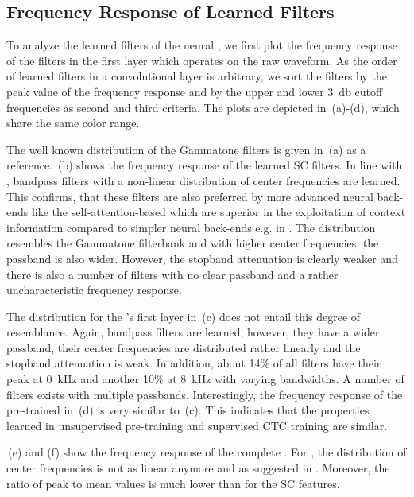 \documentclass{INTERSPEECH2023}
\begin{document}
\vspace{-0.5cm}
\subsection{Frequency Response of Learned Filters}
\label{sec:freq_resp}
To analyze the learned filters of the neural \fes, we first plot the frequency response of the filters in the first layer which operates on the raw waveform.
As the order of learned filters in a convolutional layer is arbitrary, we sort the filters by the peak value of the frequency response and by the upper and lower \SI{3}{\decibel} cutoff frequencies as second and third criteria.
The plots are depicted in \,(a)-(d), which share the same color range.

The well known distribution of the Gammatone filters is given in \,(a) as a reference.
\,(b) shows the frequency response of the learned \gls{SC} filters.
In line with \cite{tuske2018:waveform}, bandpass filters with a non-linear distribution of center frequencies are learned.
This confirms, that these filters are also preferred by more advanced neural back-ends like the self-attention-based \conformer which are superior in the exploitation of context information compared to simpler neural back-ends e.g. in \cite{tuske2014raw}.
The distribution resembles the Gammatone filterbank and with higher center frequencies, the passband is also wider.
However, the stopband attenuation is clearly weaker and there is also a number of filters with no clear passband and a rather uncharacteristic frequency response.

The distribution for the \wvtwo \fe's first layer in \,(c) does not entail this degree of resemblance.
Again, bandpass filters are learned, however, they have a wider passband, their center frequencies are distributed rather linearly and the stopband attenuation is weak.
In addition, about 14\% of all filters have their peak at \SI{0}{\kilo\hertz} and another 10\% at \SI{8}{\kilo\hertz} with varying bandwidths.
A number of filters exists with multiple passbands.
Interestingly, the frequency response of the pre-trained \wvtwo \fe in \,(d) is very similar to \,(c).
This indicates that the properties learned in unsupervised pre-training and supervised \gls{CTC} training are similar.

\,(e) and (f) show the frequency response of the complete \fe.
For \wvtwo, the distribution of center frequencies is not as linear anymore and as suggested in \cite{choi2022w2v2fe}.
Moreover, the ratio of peak to mean values is much lower than for the \gls{SC} features.
\end{document}
